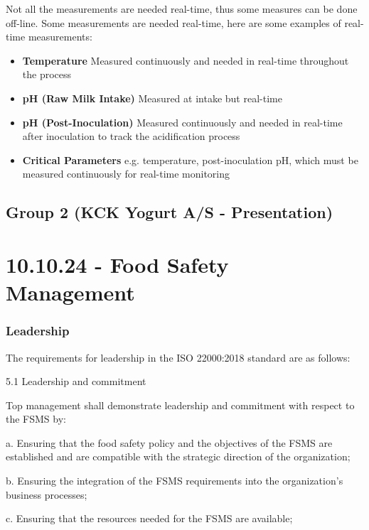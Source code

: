 Not all the measurements are needed real-time, thus some measures can be done off-line. Some measurements are needed real-time, here are some examples of real-time measurements:
\begin{highlight}
    \begin{itemize}
        \item \textbf{Temperature}
        \subitem Measured continuously and needed in real-time throughout the process
        \item \textbf{pH (Raw Milk Intake)}
        \subitem Measured at intake but real-time
        \item \textbf{pH (Post-Inoculation)}
        \subitem Measured continuously and needed in real-time after inoculation to track the acidification process
        \item \textbf{Critical Parameters}
        \subitem e.g. temperature, post-inoculation pH, which must be measured continuously for real-time monitoring
    \end{itemize}
\end{highlight}

\subsection{Group 2 (KCK Yogurt A/S - Presentation)}



\section{10.10.24 - Food Safety Management}

\subsubsection*{Leadership}
The requirements for leadership in the ISO 22000:2018 standard are as follows:

5.1 Leadership and commitment

Top management shall demonstrate leadership and commitment with respect to the FSMS by:

a. Ensuring that the food safety policy and the objectives of the FSMS are established and are compatible with the strategic direction of the organization;

b. Ensuring the integration of the FSMS requirements into the organization's business processes;

c. Ensuring that the resources needed for the FSMS are available;

